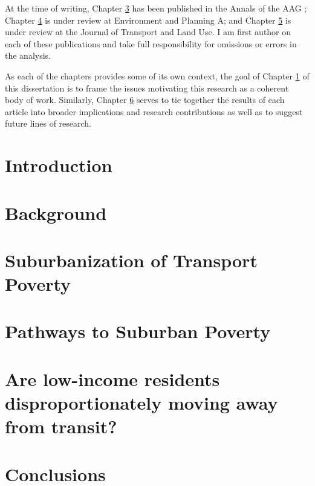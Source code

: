 \documentclass[11 pt, letterpaper]{report}
\begin{document}
At the time of writing, Chapter \ref{ch:subtrapov} has been published in the Annals of the AAG \cite{allen_suburbanization_2021}; Chapter \ref{ch:pathsubpov} is under review at Environment and Planning A; and Chapter \ref{ch:lowinctra} is under review at the Journal of Transport and Land Use. I am first author on each of these publications and take full responsibility for omissions or errors in the analysis. 

As each of the chapters provides some of its own context, the goal of Chapter \ref{ch:intro} of this dissertation is to frame the issues motivating this research as a coherent body of work. Similarly, Chapter \ref{ch:conc} serves to tie together the results of each article into broader implications and research contributions as well as to suggest future lines of research. 



\newpage


\renewcommand{\thepage}{\arabic{page}}%
\setcounter{page}{1}



\chapter{{Introduction}}


\label{ch:intro}



\chapter{Background}
\label{ch:background}




\chapter{Suburbanization of Transport Poverty}
\label{ch:subtrapov}




\chapter{Pathways to Suburban Poverty}
\label{ch:pathsubpov}




\chapter{Are low-income residents disproportionately moving away from transit?}
\label{ch:lowinctra}





\chapter{Conclusions}
\label{ch:conc}








\end{document}
